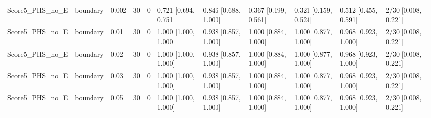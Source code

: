 \begin{longtable}{lllllllllll}
Score5\_PHS\_no\_E & boundary & 0.002 & 30 & 0 & 0.721 [0.694, 0.751] & 0.846 [0.688, 1.000] & 0.367 [0.199, 0.561] & 0.321 [0.159, 0.524] & 0.512 [0.455, 0.591] & 2/30 [0.008, 0.221] \\
Score5\_PHS\_no\_E & boundary & 0.01 & 30 & 0 & 1.000 [1.000, 1.000] & 0.938 [0.857, 1.000] & 1.000 [0.884, 1.000] & 1.000 [0.877, 1.000] & 0.968 [0.923, 1.000] & 2/30 [0.008, 0.221] \\
Score5\_PHS\_no\_E & boundary & 0.02 & 30 & 0 & 1.000 [1.000, 1.000] & 0.938 [0.857, 1.000] & 1.000 [0.884, 1.000] & 1.000 [0.877, 1.000] & 0.968 [0.923, 1.000] & 2/30 [0.008, 0.221] \\
Score5\_PHS\_no\_E & boundary & 0.03 & 30 & 0 & 1.000 [1.000, 1.000] & 0.938 [0.857, 1.000] & 1.000 [0.884, 1.000] & 1.000 [0.877, 1.000] & 0.968 [0.923, 1.000] & 2/30 [0.008, 0.221] \\
Score5\_PHS\_no\_E & boundary & 0.05 & 30 & 0 & 1.000 [1.000, 1.000] & 0.938 [0.857, 1.000] & 1.000 [0.884, 1.000] & 1.000 [0.877, 1.000] & 0.968 [0.923, 1.000] & 2/30 [0.008, 0.221] \\
\end{longtable}
